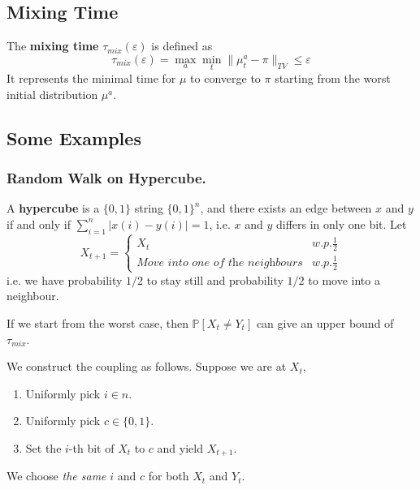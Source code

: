     \subsection{Mixing Time}
        \begin{definition}\label{def:MixingTime}
            The \textbf{mixing time} $\tau_{mix}(\varepsilon)$ is defined as
            \[ \tau_{mix}(\varepsilon) = \max_{a} \min_{t} \| \mu_t^a - \pi \|_{TV} \le \varepsilon \]
            It represents the minimal time for $\mu$ to converge to $\pi$ starting from the worst initial distribution $\mu^a$.
        \end{definition}

    \subsection{Some Examples}

        \subsubsection{Random Walk on Hypercube.}
            A \textbf{hypercube} is a $\{0,1\}$ string $\{0,1\}^n$, and there exists an edge between $x$ and $y$ if and only if $\sum_{i=1}^n|x(i)-y(i)| = 1$, i.e. $x$ and $y$ differs in only one bit.
            Let
            \[
                X_{t+1} = 
                \begin{cases}
                    X_t \quad & w.p.\frac{1}{2}\\
                    \textit{Move into one of the neighbours} & w.p.\frac{1}{2}
                \end{cases}
            \]
            i.e. we have probability $1/2$ to stay still and probability $1/2$ to move into a neighbour.

            If we start from the worst case, then $\mathbb{P}[X_t \neq Y_t]$ can give an upper bound of $\tau_{mix}$.

            We construct the coupling as follows. Suppose we are at $X_t$,
            \begin{enumerate}
                \item Uniformly pick $i \in n$.
                \item Uniformly pick $c \in \{0, 1\}$.
                \item Set the $i$-th bit of $X_t$ to $c$ and yield $X_{t+1}$.
            \end{enumerate}
            We choose \emph{the same} $i$ and $c$ for both $X_t$ and $Y_t$.

